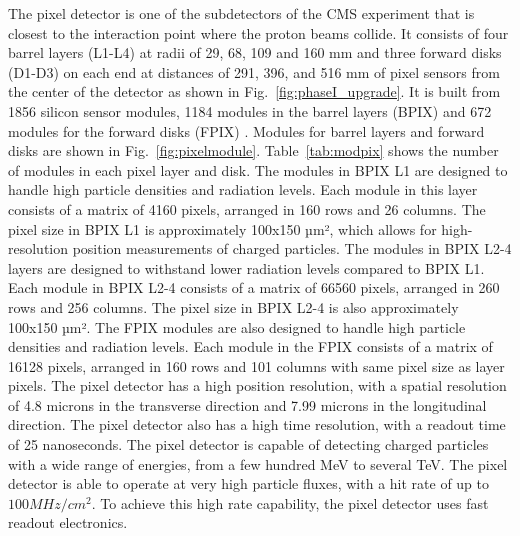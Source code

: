 The pixel detector is one of the subdetectors of the CMS experiment that is closest to the interaction point where the proton beams collide. It consists of four barrel layers (L1-L4) at radii of 29, 68, 109 and 160 mm and three forward disks (D1-D3) on each end at distances of 291, 396, and 516 mm of pixel sensors from the center of the detector as shown in Fig.~\ref{fig:phaseI_upgrade}. It is built from 1856 silicon sensor modules, 1184 modules in the barrel layers (BPIX) and 672 modules for the forward disks (FPIX) \cite{Adam:2748381}. Modules for barrel layers and forward disks are shown in Fig.~\ref{fig:pixelmodule}. Table~\ref{tab:modpix} shows the number of modules in each pixel layer and disk. The modules in BPIX L1 are designed to handle high particle densities and radiation levels. Each module in this layer consists of a matrix of 4160 pixels, arranged in 160 rows and 26 columns. The pixel size in BPIX L1 is approximately 100x150 µm², which allows for high-resolution position measurements of charged particles. The modules in BPIX L2-4 layers are designed to withstand lower radiation levels compared to BPIX L1. Each module in BPIX L2-4 consists of a matrix of 66560 pixels, arranged in 260 rows and 256 columns. The pixel size in BPIX L2-4 is also approximately 100x150 µm². The FPIX modules are also designed to handle high particle densities and radiation levels. Each module in the FPIX consists of a matrix of 16128 pixels, arranged in 160 rows and 101 columns with same pixel size as layer pixels.
The pixel detector has a high position resolution, with a spatial resolution of 4.8  microns in the transverse direction and 7.99 microns in the longitudinal direction. The pixel detector also has a high time resolution, with a readout time of 25 nanoseconds. The pixel detector is capable of detecting charged particles with a wide range of energies, from a few hundred MeV to several TeV. The pixel detector is able to operate at very high particle fluxes, with a hit rate of up to $100 MHz/cm^2$. To achieve this high rate capability, the pixel detector uses fast readout electronics.
